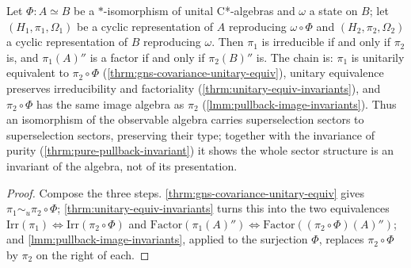 \begin{theorem}
    \label{thrm:gns-sector-transport}
    \leanok
    Let $\Phi : A \simeq B$ be a $*$-isomorphism of unital C*-algebras and $\omega$ a state on $B$; let $(H_1, \pi_1, \Omega_1)$ be a cyclic representation of $A$ reproducing $\omega \circ \Phi$ and $(H_2, \pi_2, \Omega_2)$ a cyclic representation of $B$ reproducing $\omega$. Then $\pi_1$ is irreducible if and only if $\pi_2$ is, and $\pi_1(A)''$ is a factor if and only if $\pi_2(B)''$ is. The chain is: $\pi_1$ is unitarily equivalent to $\pi_2 \circ \Phi$ (\ref{thrm:gns-covariance-unitary-equiv}), unitary equivalence preserves irreducibility and factoriality (\ref{thrm:unitary-equiv-invariants}), and $\pi_2 \circ \Phi$ has the same image algebra as $\pi_2$ (\ref{lmm:pullback-image-invariants}). Thus an isomorphism of the observable algebra carries superselection sectors to superselection sectors, preserving their type; together with the invariance of purity (\ref{thrm:pure-pullback-invariant}) it shows the whole sector structure is an invariant of the algebra, not of its presentation.
\end{theorem}
\begin{proof}
    \leanok
    Compose the three steps. \ref{thrm:gns-covariance-unitary-equiv} gives $\pi_1 \sim_u \pi_2 \circ \Phi$; \ref{thrm:unitary-equiv-invariants} turns this into the two equivalences $\mathrm{Irr}(\pi_1) \iff \mathrm{Irr}(\pi_2 \circ \Phi)$ and $\mathrm{Factor}(\pi_1(A)'') \iff \mathrm{Factor}((\pi_2 \circ \Phi)(A)'')$; and \ref{lmm:pullback-image-invariants}, applied to the surjection $\Phi$, replaces $\pi_2 \circ \Phi$ by $\pi_2$ on the right of each.
\end{proof}

